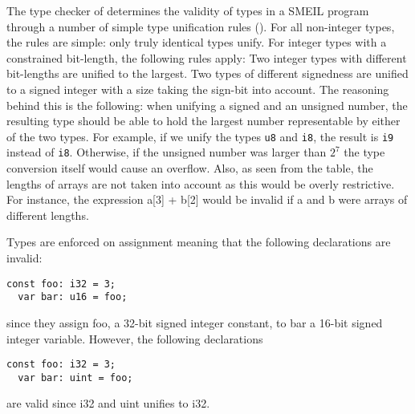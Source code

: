 
The type checker of \libsme{} determines the validity of types in a SMEIL
program through a number of simple type unification rules
(). For all non-integer types, the rules are simple: only
truly identical types unify. For integer types with a constrained bit-length,
the following rules apply: Two integer types with different bit-lengths are
unified to the largest. Two types of different signedness are unified to a
signed integer with a size taking the sign-bit into account. The reasoning
behind this is the following: when unifying a signed and an unsigned number, the
resulting type should be able to hold the largest number representable by either
of the two types. For example, if we unify the types \texttt{u8} and
\texttt{i8}, the result is \texttt{i9} instead of \texttt{i8}. Otherwise, if the
unsigned number was larger than $2^7$ the type conversion itself would cause an
overflow. Also, as seen from the table, the lengths of arrays are not taken into
account as this would be overly restrictive. For instance, the expression
{\ttfamily a[3] + b[2]} would be invalid if {\ttfamily a} and {\ttfamily b} were
arrays of different lengths.

Types are enforced on assignment meaning that the following declarations are
invalid:
\begin{lstlisting}[language=smeil]
  const foo: i32 = 3;
  var bar: u16 = foo;
\end{lstlisting}
since they assign {\ttfamily foo}, a 32-bit signed integer constant, to {\ttfamily bar} a
16-bit signed integer variable. However, the following declarations
\begin{lstlisting}[language=smeil]
  const foo: i32 = 3;
  var bar: uint = foo;
\end{lstlisting}
are valid since {\ttfamily i32} and {\ttfamily uint} unifies to {\ttfamily i32}.




